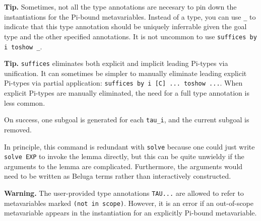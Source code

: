 \begin{description}
\textbf{Tip.}
Sometimes, not all the type annotations are necesary to pin down the
instantiations for the Pi-bound metavariables.  Instead of a type, you can use
\texttt{_} to indicate that this type annotation should be uniquely inferrable
given the goal type and the other specified annotations. It is not uncommon to
use \texttt{suffices by i toshow _}.

\textbf{Tip.}
\texttt{suffices} eliminates both explicit and implicit leading Pi-types via
unification. It can sometimes be simpler to manually eliminate leading explicit
Pi-types via partial application: \texttt{suffices by i [C] ... toshow ...}.
When explicit Pi-types are manually eliminated, the need for a full type
annotation is less common.

On success, one subgoal is generated for each \texttt{tau_i}, and the current subgoal
is removed.

In principle, this command is redundant with \texttt{solve} because one could just
write \texttt{solve EXP} to invoke the lemma directly, but this can be quite
unwieldy if the arguments to the lemma are complicated. Furthermore, the
arguments would need to be written as Beluga terms rather than interactively
constructed.

\textbf{Warning.}
The user-provided type annotations \texttt{TAU...} are allowed to refer to
metavariables marked \texttt{(not in scope)}.  However, it is an error if an
out-of-scope metavariable appears in the instantiation for an explicitly
Pi-bound metavariable.

\end{description}
